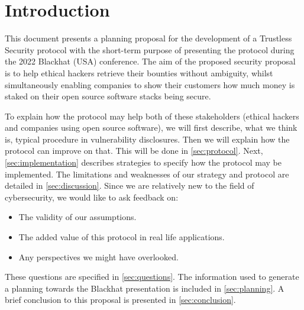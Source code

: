 \section{Introduction}
\label{sec:introduction}
This document presents a planning proposal for the development of a Trustless Security protocol with the short-term purpose of presenting the protocol during the 2022 Blackhat (USA) conference. The aim of the proposed security proposal is to help ethical hackers retrieve their bounties without ambiguity, whilst simultaneously enabling companies to show their customers how much money is staked on their open source software stacks being secure.

To explain how the protocol may help both of these stakeholders (ethical hackers and companies using open source software), we will first describe, what we think is, typical procedure in vulnerability disclosures. Then we will explain how the protocol can improve on that. This will be done in \cref{sec:protocol}. Next, \cref{sec:implementation} describes strategies to specify how the protocol may be implemented. The limitations and weaknesses of our strategy and protocol are detailed in \cref{sec:discussion}. Since we are relatively new to the field of cybersecurity, we would like to ask feedback on:
\begin{itemize}
	\item The validity of our assumptions.
	\item The added value of this protocol in real life applications.
	\item Any perspectives we might have overlooked.
\end{itemize}
These questions are specified in \cref{sec:questions}. The information used to generate a planning towards the Blackhat presentation is included in \cref{sec:planning}. A brief conclusion to this proposal is presented in \cref{sec:conclusion}.